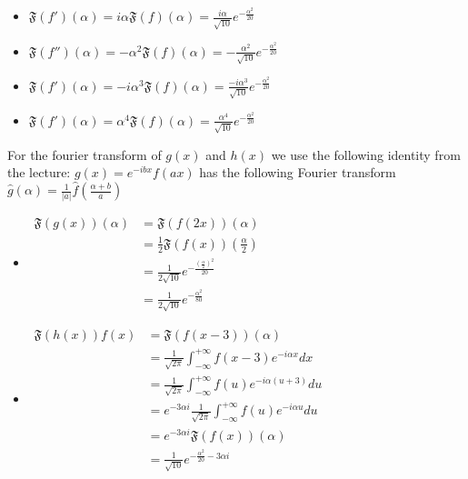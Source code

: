 \documentclass[11pt]{article}
\begin{document}
\begin{solution}
\begin{itemize}
\item $\mathfrak{F}\left(f' \right)(\alpha) = i \alpha \mathfrak{F}(f)(\alpha) = \frac{i \alpha}{\sqrt{10}} e^{-\frac{\alpha^2}{20}}$
\item $\mathfrak{F}\left(f'' \right)(\alpha) = -\alpha^2 \mathfrak{F}(f)(\alpha) = -\frac{ \alpha^2}{\sqrt{10}} e^{-\frac{\alpha^2}{20}}$
\item $\mathfrak{F}\left(f' \right)(\alpha) = -i \alpha^3 \mathfrak{F}(f)(\alpha) = \frac{-i \alpha^3}{\sqrt{10}} e^{-\frac{\alpha^2}{20}}$
\item $\mathfrak{F}\left(f' \right)(\alpha) = \alpha^4 \mathfrak{F}(f)(\alpha) = \frac{ \alpha^4}{\sqrt{10}} e^{-\frac{\alpha^2}{20}}$
\end{itemize}
For the fourier transform of $g(x)$ and $h(x)$ we use the following identity from the lecture: $g(x)=e^{-i b x} f(a x)$ has the following Fourier transform 
$\hat{g}(\alpha)=\frac{1}{|a|} \hat{f}\left(\frac{\alpha+b}{a}\right)$
\begin{itemize}
\item $\begin{aligned} \mathfrak{F}(g(x))(\alpha) & =\mathfrak{F}(f(2 x))(\alpha) \\ & =\frac{1}{2} \mathfrak{F}(f(x))\left(\frac{\alpha}{2}\right) \\ & =\frac{1}{2 \sqrt{10}} e^{-\frac{\left(\frac{\alpha}{2}\right)^2}{20}} \\ & =\frac{1}{2 \sqrt{10}} e^{-\frac{\alpha^2}{80}}\end{aligned}$
\item $\begin{aligned} \mathfrak{F}(h(x)) f(x) & =\mathfrak{F}(f(x-3))(\alpha) \\ & =\frac{1}{\sqrt{2 \pi}} \int_{-\infty}^{+\infty} f(x-3) e^{-i \alpha x} d x \\ & =\frac{1}{\sqrt{2 \pi}} \int_{-\infty}^{+\infty} f(u) e^{-i \alpha(u+3)} d u \\ & =e^{-3 \alpha i} \frac{1}{\sqrt{2 \pi}} \int_{-\infty}^{+\infty} f(u) e^{-i \alpha u} d u \\ & =e^{-3 \alpha i} \mathfrak{F}(f(x))(\alpha) \\ & =\frac{1}{\sqrt{10}} e^{-\frac{\alpha^2}{20}-3 \alpha i}\end{aligned}$
\end{itemize}
\end{solution}
\end{document}

